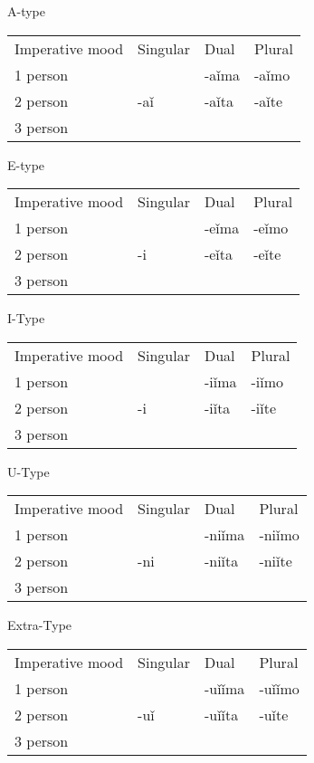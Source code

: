 A-type

\begin{table}
	\begin{tabular}{llll}
		Imperative mood & Singular & Dual & Plural \\
		1 person &  & -aǐma & -aǐmo \\
		2 person & -aǐ & -aǐta & -aǐte \\
		3 person &  &  & 
	\end{tabular}
\end{table}

E-type

\begin{table}
	\begin{tabular}{llll}
		Imperative mood & Singular & Dual & Plural \\
		1 person &  & -eǐma & -eǐmo \\
		2 person & -i & -eǐta & -eǐte \\
		3 person &  &  & 
	\end{tabular}
\end{table}

I-Type

\begin{table}
	\begin{tabular}{llll}
		Imperative mood & Singular & Dual & Plural \\
		1 person &  & -iǐma & -iǐmo \\
		2 person & -i & -iǐta & -iǐte \\
		3 person &  &  & 
	\end{tabular}
\end{table}

U-Type

\begin{table}
	\begin{tabular}{llll}
		Imperative mood & Singular & Dual & Plural \\
		1 person &  & -niǐma & -niǐmo \\
		2 person & -ni & -niǐta & -niǐte \\
		3 person &  &  & 
	\end{tabular}
\end{table}

Extra-Type

\begin{table}
	\begin{tabular}{llll}
		Imperative mood & Singular & Dual & Plural \\
		1 person &  & -uǐǐma & -uǐǐmo \\
		2 person & -uǐ & -uǐǐta & -uǐte \\
		3 person &  &  & 
	\end{tabular}
\end{table}

